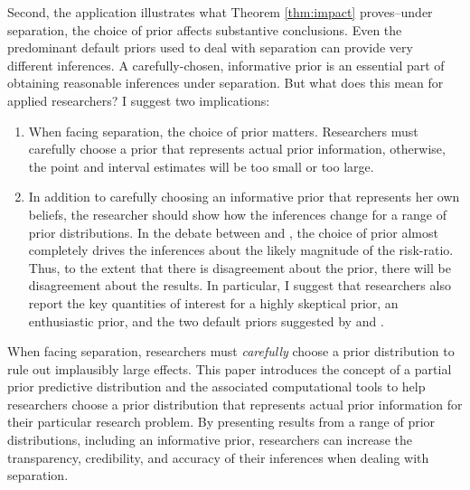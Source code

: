 \documentclass[12pt]{article}
\begin{document}
Second, the application illustrates what Theorem \ref{thm:impact} proves--under separation, the choice of prior affects substantive conclusions. Even the predominant default priors used to deal with separation can provide very different inferences. A carefully-chosen, informative prior is an essential part of obtaining reasonable inferences under separation. But what does this mean for applied researchers? I suggest two implications:
\begin{enumerate}
\item When facing separation, the choice of prior matters. Researchers must carefully choose a prior that represents actual prior information, otherwise, the point and interval estimates will be too small or too large.
\item In addition to carefully choosing an informative prior that represents her own beliefs, the researcher should show how the inferences change for a range of prior distributions. In the debate between \cite{BellMiller2014} and \cite{Rauchhaus2009}, the choice of prior almost completely drives the inferences about the likely magnitude of the risk-ratio. Thus, to the extent that there is disagreement about the prior, there will be disagreement about the results. In particular, I suggest that researchers also report the key quantities of interest for a highly skeptical prior, an enthusiastic prior, and the two default priors suggested by \cite{Zorn2005} and \cite{Gelmanetal2008}.
\end{enumerate}

When facing separation, researchers must \emph{carefully} choose a prior distribution to rule out implausibly large effects. This paper introduces the concept of a partial prior predictive distribution and the associated computational tools to help researchers choose a prior distribution that represents actual prior information for their particular research problem. By presenting results from a range of prior distributions, including an informative prior, researchers can increase the transparency, credibility, and accuracy of their inferences when dealing with separation.

\clearpage


\end{document}
